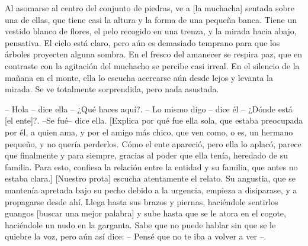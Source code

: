 Al asomarse al centro del conjunto de piedras, ve a [la muchacha] sentada sobre una de ellas, que tiene casi la altura y la forma de una pequeña banca. Tiene un vestido blanco de flores, el pelo recogido en una trenza, y la mirada hacia abajo, pensativa. El cielo está claro, pero aún es demasiado temprano para que los árboles proyecten alguna sombra. En el fresco del amanecer se respira paz, que en contraste con la agitación del muchacho se percibe casi irreal. En el silencio de la mañana en el monte, ella lo escucha acercarse aún desde lejos y levanta la mirada. Se ve totalmente sorprendida, pero nada asustada.

-- Hola -- dice ella -- ¿Qué haces aquí?. -- Lo mismo digo -- dice él -- ¿Dónde está [el ente]?. --Se fué-- dice ella. [Explica por qué fue ella sola, que estaba preocupada por él, a quien ama, y por el amigo más chico, que ven como, o es, un hermano pequeño, y no quería perderlos. Cómo el ente apareció, pero ella lo aplacó, parece que finalmente y para siempre, gracias al poder que ella tenía, heredado de su familia. Para esto, confiesa la relación entre la entidad y su familia, que antes no estaba clara.] [Nuestro prota] escucha atentamente el relato. Su angustia, que se mantenía apretada bajo su pecho debido a la urgencia, empieza a disiparase, y a propagarse desde ahí. Llega hasta sus brazos y piernas, haciéndole sentirlos guangos [buscar una mejor palabra] y sube hasta que se le atora en el cogote, haciéndole un nudo en la garganta. Sabe que no puede hablar sin que se le quiebre la voz, pero aún así dice: -- Pensé que no te iba a volver a ver --.

